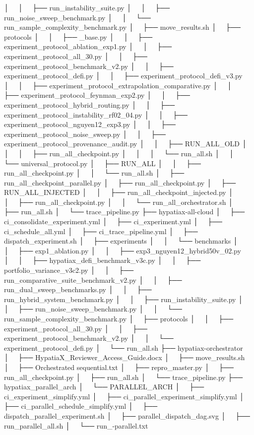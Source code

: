 │   │       ├── run_instability_suite.py
│   │       ├── run_noise_sweep_benchmark.py
│   │       └── run_sample_complexity_benchmark.py
│   ├── move_results.sh
│   ├── protocols
│   │   ├── _base.py
│   │   ├── experiment_protocol_ablation_exp1.py
│   │   ├── experiment_protocol_all_30.py
│   │   ├── experiment_protocol_benchmark_v2.py
│   │   ├── experiment_protocol_defi.py
│   │   ├── experiment_protocol_defi_v3.py
│   │   ├── experiment_protocol_extrapolation_comparative.py
│   │   ├── experiment_protocol_feynman_exp2.py
│   │   ├── experiment_protocol_hybrid_routing.py
│   │   ├── experiment_protocol_instability_rf02_04.py
│   │   ├── experiment_protocol_nguyen12_exp3.py
│   │   ├── experiment_protocol_noise_sweep.py
│   │   ├── experiment_protocol_provenance_audit.py
│   │   ├── RUN_ALL_OLD
│   │   │   ├── run_all_checkpoint.py
│   │   │   └── run_all.sh
│   │   └── universal_protocol.py
│   ├── RUN_ALL
│   │   ├── run_all_checkpoint.py
│   │   └── run_all.sh
│   ├── run_all_checkpoint_parallel.py
│   ├── run_all_checkpoint.py
│   ├── RUN_ALL_INJECTED
│   │   ├── run_all_checkpoint_injected.py
│   │   ├── run_all_checkpoint.py
│   │   └── run_all_orchestrator.sh
│   ├── run_all.sh
│   └── trace_pipeline.py
├── hypatiax-all-cloud
│   ├── ci_consolidate_experiment.yml
│   ├── ci_experiment.yml
│   ├── ci_schedule_all.yml
│   ├── ci_trace_pipeline.yml
│   ├── dispatch_experiment.sh
│   ├── experiments
│   │   └── benchmarks
│   │       ├── exp1_ablation.py
│   │       ├── exp3_nguyen12_hybrid50v_02.py
│   │       ├── hypatiax_defi_benchmark_v3c.py
│   │       ├── portfolio_variance_v3c2.py
│   │       ├── run_comparative_suite_benchmark_v2.py
│   │       ├── run_dual_sweep_benchmarks.py
│   │       ├── run_hybrid_system_benchmark.py
│   │       ├── run_instability_suite.py
│   │       ├── run_noise_sweep_benchmark.py
│   │       └── run_sample_complexity_benchmark.py
│   ├── protocols
│   │   ├── experiment_protocol_all_30.py
│   │   ├── experiment_protocol_benchmark_v2.py
│   │   └── experiment_protocol_defi.py
│   └── run_all.sh
├── hypatiax-orchestrator
│   ├── HypatiaX_Reviewer_Access_Guide.docx
│   ├── move_results.sh
│   ├── Orchestrated sequential.txt
│   ├── repro_master.py
│   ├── run_all_checkpoint.py
│   ├── run_all.sh
│   └── trace_pipeline.py
├── hypatiax_parallel_arch
│   └── PARALLEL_ARCH
│       ├── ci_experiment_simplify.yml
│       ├── ci_parallel_experiment_simplify.yml
│       ├── ci_parallel_schedule_simplify.yml
│       ├── dispatch_parallel_experiment.sh
│       ├── parallel_dispatch_dag.svg
│       ├── run_parallel_all.sh
│       └── run_-parallel.txt
